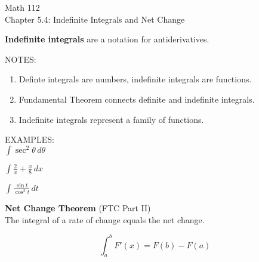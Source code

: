 \documentclass[11pt]{article}
\begin{document}
\begin{center}
\Large
\rm{Math 112}
\\
\rm{Chapter 5.4:  Indefinite Integrals and Net Change}
\\
\end{center}
\vspace{0.2in}

{\bf Indefinite integrals} are a notation for antiderivatives.


\vspace{3in}


NOTES:  \\

\begin{enumerate}

\item{Definte integrals are numbers, indefinite integrals are functions.}

  \vspace{1in.}

\item{Fundamental Theorem connects definite and indefinite integrals.}

  \vspace{1in.}
  
\item{Indefinite integrals represent a family of functions.}

    \vspace{1in.}

    \end{enumerate}


\pagebreak

    EXAMPLES: \\
    
 $\int \sec^2{\theta} \, d\theta$

    \vspace{1in}

   
$\int \frac{2}{x}+  \frac{x}{8}\, dx$
    
    
    \vspace{1in}

        $\int \frac{\sin{t}}{\cos^2{t}} \, dt$

    \vspace{1in}

{\bf Net Change Theorem} (FTC Part II)\\

The integral of a rate of change equals the net change.

\begin{displaymath}
\int_a^bF'(x) = F(b)-F(a)
\end{displaymath}
\end{document}
